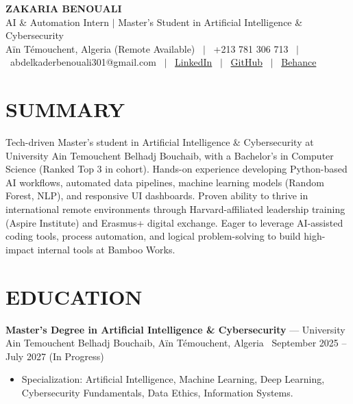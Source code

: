 \documentclass[10.5pt, letterpaper]{article}
\newcommand{\entry}[4]{%
  \noindent\textbf{#1} --- #3, #4 \textbar\ #2\par
  \vspace{2pt}
}
\newcommand{\resumeItem}[1]{\item #1}
\begin{document}
\RaggedRight

\begin{center}
  {\Huge \textbf{ZAKARIA BENOUALI}}\\[4pt]
  {\large AI \& Automation Intern $|$ Master's Student in Artificial Intelligence \& Cybersecurity}\\[4pt]
  Aïn Témouchent, Algeria (Remote Available) \ $|$ \ +213 781 306 713 \ $|$ \ abdelkaderbenouali301@gmail.com \ $|$ \ \href{https://www.linkedin.com/in/benouali-abdelkader-yahia-zakaria-4a917a247}{LinkedIn} \ $|$ \ \href{https://github.com/benoualiabdelkader}{GitHub} \ $|$ \ \href{https://www.behance.net/abdelkaderbeno}{Behance}
\end{center}

\vspace{2pt}

\section{SUMMARY}
Tech-driven Master's student in Artificial Intelligence \& Cybersecurity at University Ain Temouchent Belhadj Bouchaib, with a Bachelor's in Computer Science (Ranked Top 3 in cohort). Hands-on experience developing Python-based AI workflows, automated data pipelines, machine learning models (Random Forest, NLP), and responsive UI dashboards. Proven ability to thrive in international remote environments through Harvard-affiliated leadership training (Aspire Institute) and Erasmus+ digital exchange. Eager to leverage AI-assisted coding tools, process automation, and logical problem-solving to build high-impact internal tools at Bamboo Works.

\section{EDUCATION}

\entry{Master's Degree in Artificial Intelligence \& Cybersecurity}{September 2025 -- July 2027 (In Progress)}{University Ain Temouchent Belhadj Bouchaib}{Aïn Témouchent, Algeria}
\begin{itemize}
  \resumeItem{Specialization: Artificial Intelligence, Machine Learning, Deep Learning, Cybersecurity Fundamentals, Data Ethics, Information Systems.}
\end{itemize}
\end{document}
